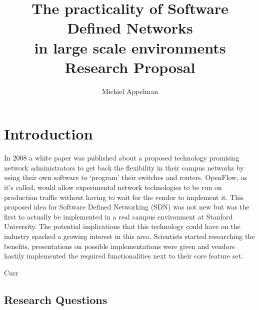 \documentclass[oneside,twocolumn,8pt,a4paper]{article}
\title{The practicality of Software Defined Networks\\in large scale environments\\[0.3cm]
\Large{Research Proposal}}
\author{Michiel Appelman}
\begin{document}
	\maketitle
	
	
	\section{Introduction} %
	\label{sec:introduction}
	In 2008 a white paper was published about a proposed technology promising network administrators to get back the flexibility in their campus networks by using their own software to `program' their switches and routers.\cite{openflow} OpenFlow, as it's called, would allow experimental network technologies to be run on production traffic without having to wait for the vendor to implement it. This proposed idea for Software Defined Networking (SDN) was not new but was the first to actually be implemented in a real campus environment at Stanford University. The potential implications that this technology could have on the industry sparked a growing interest in this area. Scientists started researching the benefits, presentations on possible implementations were given and vendors hastily implemented the required functionalities next to their core feature set.
	
	Curr
							
		\subsection*{Research Questions} %
		\label{sub:research_questions}
		
\end{document}
